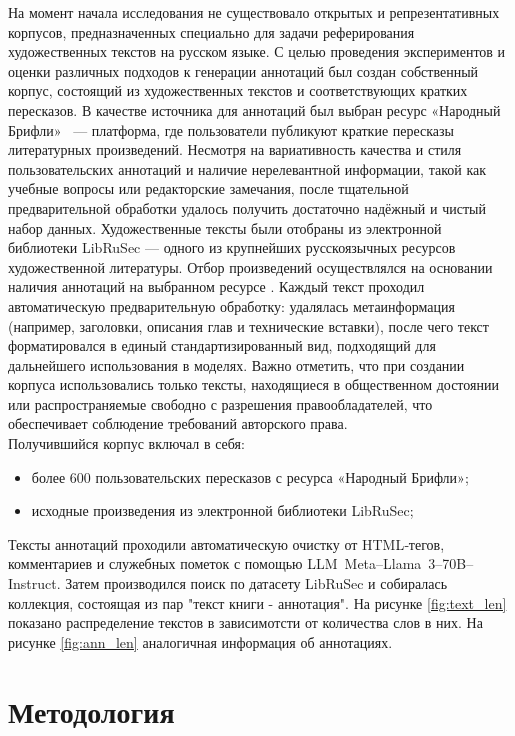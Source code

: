 \documentclass{article}
\theoremstyle{definition}
\theoremstyle{plain}
\begin{document}
На момент начала исследования не существовало открытых и репрезентативных корпусов, предназначенных специально для задачи реферирования художественных текстов на русском языке. С целью проведения экспериментов и оценки различных подходов к генерации аннотаций был создан собственный корпус, состоящий из художественных текстов и соответствующих кратких пересказов. 
В качестве источника для аннотаций был выбран ресурс «Народный Брифли»~\cite{Briefly} — платформа, где пользователи публикуют краткие пересказы литературных произведений. 
Несмотря на вариативность качества и стиля пользовательских аннотаций и наличие нерелевантной информации, такой как учебные вопросы или редакторские замечания, после тщательной предварительной обработки удалось получить достаточно надёжный и чистый набор данных.
Художественные тексты были отобраны из электронной библиотеки LibRuSec — одного из крупнейших русскоязычных ресурсов художественной литературы. 
Отбор произведений осуществлялся на основании наличия аннотаций на выбранном ресурсе \cite{Briefly}. Каждый текст проходил автоматическую предварительную обработку: удалялась метаинформация (например, заголовки, описания глав и технические вставки), 
после чего текст форматировался в единый стандартизированный вид, подходящий для дальнейшего использования в моделях.
Важно отметить, что при создании корпуса использовались только тексты, находящиеся в общественном достоянии или распространяемые свободно с разрешения правообладателей, что обеспечивает соблюдение требований авторского права.
\\Получившийся корпус включал в себя:
\begin{itemize}
  \item более 600 пользовательских пересказов с ресурса «Народный Брифли»;
  \item исходные произведения из электронной библиотеки LibRuSec;
\end{itemize}
Тексты аннотаций проходили автоматическую очистку от HTML‑тегов, комментариев и служебных пометок с помощью LLM~Meta--Llama~3--70B--Instruct. Затем производился поиск по датасету LibRuSec и собиралась коллекция, состоящая из пар "текст книги - аннотация".
На рисунке \ref{fig:text_len} показано распределение текстов в зависимотсти от количества слов в них. На рисунке \ref{fig:ann_len} аналогичная информация об аннотациях.

\section*{Методология}
\end{document}
